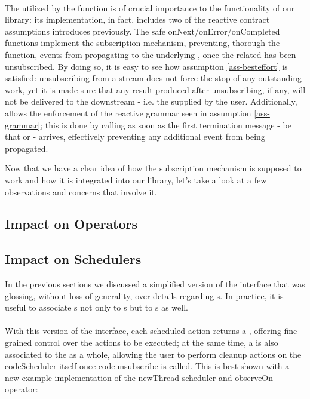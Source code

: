 \\

The  utilized by the  function is of crucial importance to the functionality of our library: its implementation, in fact, includes two of the reactive contract assumptions introduces previously. The safe onNext/onError/onCompleted functions implement the subscription mechanism, preventing, thorough the  function, events from propagating to the underlying , once the related  has been unsubscribed. By doing so, it is easy to see how assumption \ref{ass-besteffort} is satisfied: unsubscribing from a stream does not force the stop of any outstanding work, yet it is made sure that any result produced after unsubscribing, if any, will not be delivered to the downstream  - i.e. the  supplied by the user. Additionally,  allows the enforcement of the reactive grammar seen in assumption \ref{ass-grammar}; this is done by calling  as soon as the first termination message - be that  or  - arrives, effectively preventing any additional event from being propagated.

Now that we have a clear idea of how the subscription mechanism is supposed to work and how it is integrated into our library, let's take a look at a few observations and concerns that involve it. 

\subsection{Impact on Operators}

\subsection{Impact on Schedulers}

In the previous sections we discussed a simplified version of the  interface that was glossing, without loss of generality, over details regarding s. In practice, it is useful to associate s not only to s but to s as well. \\

\\

With this version of the interface, each scheduled action returns a , offering fine grained control over the actions to be executed; at the same time, a  is also associated to the  as a whole, allowing the user to perform cleanup actions on the code{Scheduler} itself once code{unsubscribe} is called. This is best shown with a new example implementation of the newThread scheduler and observeOn operator:\\

